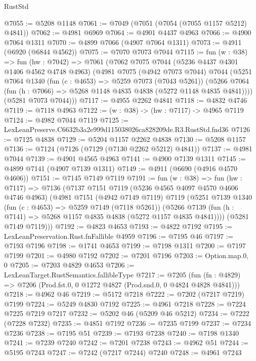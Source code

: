 \begin{lexlean}{RustStd}
\begin{coremodule}
@7055 := @5208 @1148
@7061 := @7049 (@7051 (@7054 (@7055 @1157 @5212) @4841))
@7062 := @4981 @6969
@7064 := @4901 @4437 @4963
@7066 := @4900 @7064 @1311
@7070 := @4899 @7066 (@4907 @7064 @1311)
@7073 := @4911 (@6920 (@6844 @4562))
@7075 := @7070 @7073 @7044
@7115 := fun (w : @38) =>
  fun (hw : @7042) =>
  @7061
    (@7062
      @7075
      @7044
      (@5236 @4437 @4301 @1406 @4562 @4748 @4963)
      (@4981
        @7075
        (@4942 @7073 @7044)
        @7044
        (@5251
          @7064
          @1340
          (fun (c : @4653) => @5259 @7073 (@7043 @5261))
          (@5266 @7064 (fun (h : @7066) => @5268 @1148 @4835 @4838 (@5272 @1148 @4835 @4841))))
        (@5281 @7073 @7044)))
@7117 := @4955 @2262 @4841
@7118 := @4832 @4746
@7119 := @7118 @4963
@7122 := (w : @38) -> (hw : @7117) -> @4965 @7119
@7124 := @4982 @7044 @7119
@7125 := LexLeanPreserve.C6632b3a2e999d115038026ca828209de.R3.RustStd.fnd36
@7126 := @7125 @4838
@7129 := @5204 @1157 @2262 @4838
@7130 := @5208 @1157
@7136 := @7124 (@7126 (@7129 (@7130 @2262 @5212) @4841))
@7137 := @4981 @7044
@7139 := @4901 @4565 @4963
@7141 := @4900 @7139 @1311
@7145 := @4899 @7141 (@4907 @7139 @1311)
@7149 := @4911 (@6690 (@4916 @4570 @4606))
@7151 := @7145 @7149 @7119
@7191 := fun (w : @38) =>
  fun (hw : @7117) =>
  @7136
    (@7137
      @7151
      @7119
      (@5236 @4565 @4097 @4570 @4606 @4746 @4963)
      (@4981
        @7151
        (@4942 @7149 @7119)
        @7119
        (@5251
          @7139
          @1340
          (fun (c : @4653) => @5259 @7149 (@7118 @5261))
          (@5266 @7139 (fun (h : @7141) => @5268 @1157 @4835 @4838 (@5272 @1157 @4835 @4841))))
        (@5281 @7149 @7119)))
@7192 := @4823 @4653
@7193 := @4822 @7192
@7195 := LexLeanPreservation.Rust.fnFallible @4959
@7196 := @7195 @46
@7197 := @7193 @7196
@7198 := @1741 @4653
@7199 := @7198 @1311
@7200 := @7197 @7199
@7201 := @4980 @7192
@7202 := @7201 @7196
@7203 := Option.map.{0, 0}
@7205 := @7203 @4829 @4653
@7206 := LexLeanTarget.RustSemantics.fallibleType
@7217 := @7205
    (fun (fn : @4829) => @7206 (Prod.fst.{0, 0} @1272 @4827 (Prod.snd.{0, 0} @4824 @4828 @4841)))
@7218 := @4962 @46
@7219 := @5172 @7218
@7222 := @7202 (@7217 @7219) @7199
@7224 := @5249 @4830 @7192
@7225 := @4961 @7218
@7228 := @7224 @7225 @7219 @7217
@7232 := @5202 @46 (@5209 @46 @5212)
@7234 := @7222 (@7228 @7232)
@7235 := @4851 @7192
@7236 := @7235 @7199
@7237 := @7234 @7236
@7238 := @7195 @51
@7239 := @7193 @7238
@7240 := @7198 @1340
@7241 := @7239 @7240
@7242 := @7201 @7238
@7243 := @4962 @51
@7244 := @5195 @7243
@7247 := @7242 (@7217 @7244) @7240
@7248 := @4961 @7243

\end{coremodule}
\end{lexlean}
